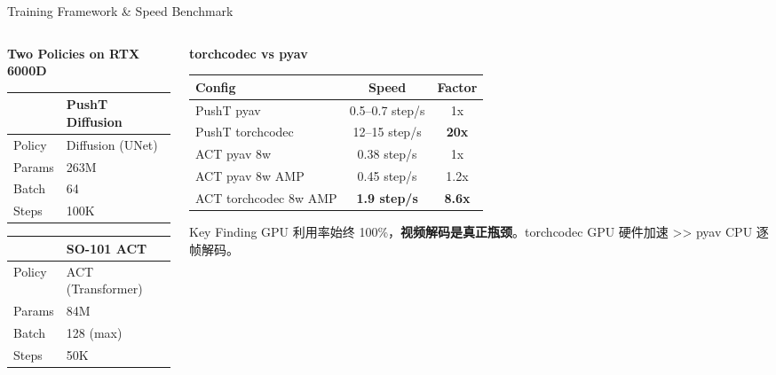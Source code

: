 \documentclass[aspectratio=169, 10pt, xcolor=dvipsnames]{beamer}
\begin{document}
\begin{frame}{Training Framework \& Speed Benchmark}
\begin{columns}[T]
\begin{column}{0.48\textwidth}
\textbf{Two Policies on RTX 6000D}

\vspace{0.2em}
\scriptsize
\begin{tabular}{ll}
\toprule
 & \textbf{PushT Diffusion} \\
\midrule
Policy   & Diffusion (UNet) \\
Params   & 263M \\
Batch    & 64 \\
Steps    & 100K \\
\bottomrule
\end{tabular}

\vspace{0.4em}
\begin{tabular}{ll}
\toprule
 & \textbf{SO-101 ACT} \\
\midrule
Policy   & ACT (Transformer) \\
Params   & 84M \\
Batch    & 128 (max) \\
Steps    & 50K \\
\bottomrule
\end{tabular}
\end{column}

\begin{column}{0.50\textwidth}
\textbf{torchcodec vs pyav}

\vspace{0.2em}
\scriptsize
\begin{tabular}{lcc}
\toprule
\textbf{Config} & \textbf{Speed} & \textbf{Factor} \\
\midrule
PushT pyav        & 0.5--0.7 step/s & 1x \\
\rowcolor{thupurple!10}
PushT torchcodec  & 12--15 step/s & \textbf{20x} \\
\midrule
ACT pyav 8w       & 0.38 step/s & 1x \\
ACT pyav 8w AMP   & 0.45 step/s & 1.2x \\
\rowcolor{thupurple!10}
ACT torchcodec 8w AMP & \textbf{1.9 step/s} & \textbf{8.6x} \\
\bottomrule
\end{tabular}

\vspace{0.4em}
\begin{exampleblock}{\scriptsize Key Finding}
\scriptsize GPU 利用率始终 100\%，\textbf{视频解码是真正瓶颈}。torchcodec GPU 硬件加速 >> pyav CPU 逐帧解码。
\end{exampleblock}
\end{column}
\end{columns}
\end{frame}
\end{document}
